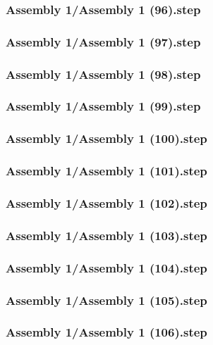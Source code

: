 \documentclass[a4paper,12pt]{article}
\begin{document}
\subsubsection{Assembly 1/Assembly 1 (96).step}

\subsubsection{Assembly 1/Assembly 1 (97).step}

\subsubsection{Assembly 1/Assembly 1 (98).step}

\subsubsection{Assembly 1/Assembly 1 (99).step}

\subsubsection{Assembly 1/Assembly 1 (100).step}

\subsubsection{Assembly 1/Assembly 1 (101).step}

\subsubsection{Assembly 1/Assembly 1 (102).step}

\subsubsection{Assembly 1/Assembly 1 (103).step}

\subsubsection{Assembly 1/Assembly 1 (104).step}

\subsubsection{Assembly 1/Assembly 1 (105).step}

\subsubsection{Assembly 1/Assembly 1 (106).step}

\end{document}

